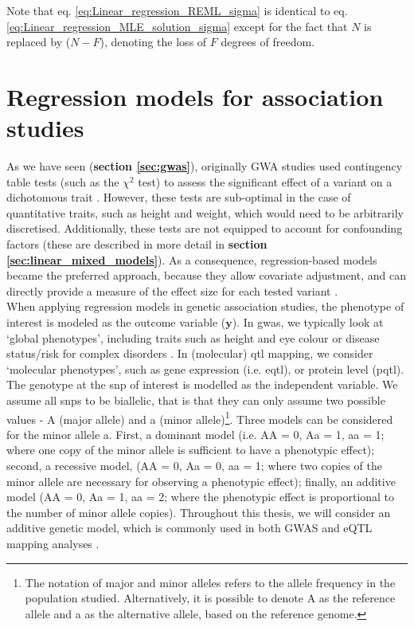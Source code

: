 Note that eq. \eqref{eq:Linear_regression_REML_sigma} is identical to eq. \eqref{eq:Linear_regression_MLE_solution_sigma} except for the fact that $N$ is replaced by ($N-F$), denoting the loss of $F$ degrees of freedom.

\newpage


\section{Regression models for association studies}
\label{sec:linear_models_genetics}

As we have seen (\textbf{section \ref{sec:gwas}}), originally GWA studies used contingency table tests (such as the $\chi^2$ test) to assess the significant effect of a variant on a dichotomous trait \cite{mccarthy2008genome}.
However, these tests are sub-optimal in the case of quantitative traits, such as height and weight, which would need to be arbitrarily discretised.
Additionally, these tests are not equipped to account for confounding factors (these are described in more detail in \textbf{section \ref{sec:linear_mixed_models}}).
As a consequence, regression-based models became the preferred approach, because they allow covariate adjustment, and can directly provide a measure of the effect size for each tested variant \cite{bush2012genome}.\\

When applying regression models in genetic association studies, the phenotype of interest is modeled as the outcome variable ($\mathbf{y}$). 
In \gls{gwas}, we typically look at `global phenotypes', including traits such as height and eye colour or disease status/risk for complex disorders \cite{mccarthy2008genome}.
In (molecular) \gls{qtl} mapping, we consider `molecular phenotypes', such as gene expression (i.e. e\gls{qtl}), or protein level (p\gls{qtl}).
\\

The genotype at the \gls{snp} of interest is modelled as the independent variable.
We assume all \gls{snp}s to be biallelic, that is that they can only assume two possible values - A (major allele) and a (minor allele)\footnote{The notation of major and minor alleles refers to the allele frequency in the population studied.
Alternatively, it is possible to denote A as the reference allele and a as the alternative allele, based on the reference genome.}. 
Three models can be considered for the minor allele a.
First, a dominant model (i.e. AA = 0, Aa = 1, aa = 1; where one copy of the minor allele is sufficient to have a phenotypic effect); second, a recessive model, (AA = 0, Aa = 0, aa = 1; where two copies of the minor allele are necessary for observing a phenotypic effect); finally, an additive model (AA = 0, Aa = 1, aa = 2; where the phenotypic effect is proportional to the number of minor allele copies). 
Throughout this thesis, we will consider an additive genetic model, which is commonly used in both GWAS and eQTL mapping analyses \cite{laird2010fundamentals}.
\\

